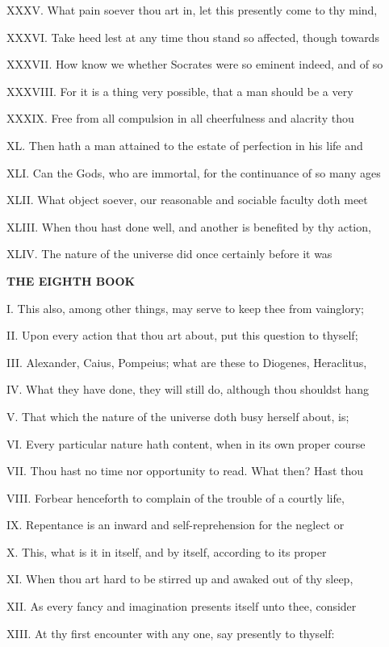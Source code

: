 XXXV. What pain soever thou art in, let this
presently come to thy mind,

XXXVI. Take heed lest at any time thou stand
so affected, though towards

XXXVII. How know we whether Socrates were so
eminent indeed, and of so

XXXVIII. For it is a thing very possible, that
a man should be a very

XXXIX. Free from all compulsion in all
cheerfulness and alacrity thou

XL. Then hath a man attained to the estate of
perfection in his life and

XLI. Can the Gods, who are immortal, for the
continuance of so many ages

XLII. What object soever, our reasonable and
sociable faculty doth meet

XLIII. When thou hast done well, and another
is benefited by thy action,

XLIV. The nature of the universe did once
certainly before it was

\textbf{THE EIGHTH BOOK}

I. This also, among other things, may serve to
keep thee from vainglory;

II. Upon every action that thou art about, put
this question to thyself;

III. Alexander, Caius, Pompeius; what are
these to Diogenes, Heraclitus,

IV. What they have done, they will still do,
although thou shouldst hang

V. That which the nature of the universe doth
busy herself about, is;

VI. Every particular nature hath content, when
in its own proper course

VII. Thou hast no time nor opportunity to
read. What then? Hast thou

VIII. Forbear henceforth to complain of the
trouble of a courtly life,

IX. Repentance is an inward and
self-reprehension for the neglect or

X. This, what is it in itself, and by itself,
according to its proper

XI. When thou art hard to be stirred up and
awaked out of thy sleep,

XII. As every fancy and imagination presents
itself unto thee, consider

XIII. At thy first encounter with any one, say
presently to thyself:

